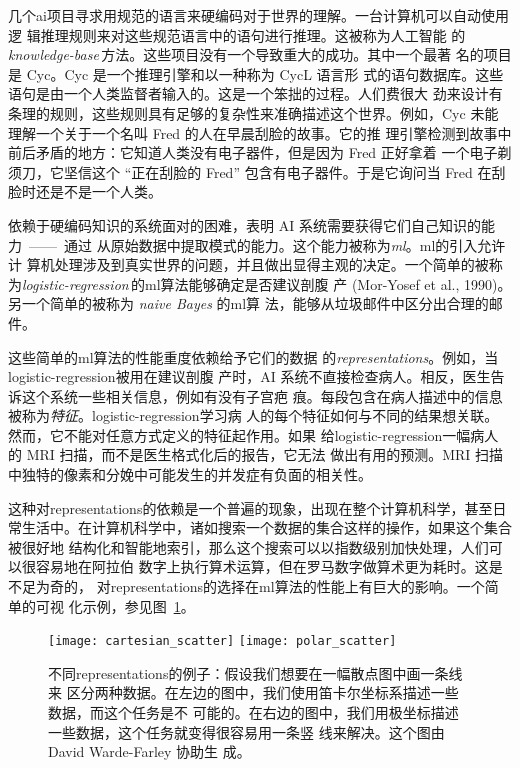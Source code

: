 几个\gls*{ai}项目寻求用规范的语言来硬编码对于世界的理解。一台计算机可以自动使用逻
辑推理规则来对这些规范语言中的语句进行推理。这被称为人工智能
的\emph{\gls{knowledge-base}}\,方法。这些项目没有一个导致重大的成功。其中一个最著
名的项目是 Cyc\citep{Lenat-1989-book}。Cyc 是一个推理引擎和以一种称为 CycL 语言形
式的语句数据库。这些语句是由一个人类监督者输入的。这是一个笨拙的过程。人们费很大
劲来设计有条理的规则，这些规则具有足够的复杂性来准确描述这个世界。例如，Cyc 未能
理解一个关于一个名叫 Fred 的人在早晨刮脸的故事\citep{MachineChangedWorld}。它的推
理引擎检测到故事中前后矛盾的地方：它知道人类没有电子器件，但是因为 Fred 正好拿着
一个电子剃须刀，它坚信这个 ``正在刮脸的 Fred'' 包含有电子器件。于是它询问当 Fred
在刮脸时还是不是一个人类。

依赖于硬编码知识的系统面对的困难，表明 AI 系统需要获得它们自己知识的能力~——~通过
从原始数据中提取模式的能力。这个能力被称为\emph{\gls{ml}}。\gls*{ml}的引入允许计
算机处理涉及到真实世界的问题，并且做出显得主观的决定。一个简单的被称
为\emph{\gls{logistic-regression}}\,的\gls*{ml}算法能够确定是否建议剖腹
产 (Mor-Yosef et al., 1990)。另一个简单的被称为 \emph{naive Bayes} 的\gls*{ml}算
法，能够从垃圾邮件中区分出合理的邮件。

这些简单的\gls*{ml}算法的性能重度依赖给予它们的数据
的\emph{\gls{representations}}。例如，当\gls*{logistic-regression}被用在建议剖腹
产时，AI 系统不直接检查病人。相反，医生告诉这个系统一些相关信息，例如有没有子宫疤
痕。每段包含在病人描述中的信息被称为\emph{特征}。\gls*{logistic-regression}学习病
人的每个特征如何与不同的结果想关联。然而，它不能对任意方式定义的特征起作用。如果
给\gls*{logistic-regression}一幅病人的 MRI 扫描，而不是医生格式化后的报告，它无法
做出有用的预测。MRI 扫描中独特的像素和分娩中可能发生的并发症有负面的相关性。

这种对\gls*{representations}的依赖是一个普遍的现象，出现在整个计算机科学，甚至日
常生活中。在计算机科学中，诸如搜索一个数据的集合这样的操作，如果这个集合被很好地
结构化和智能地索引，那么这个搜索可以以指数级别加快处理，人们可以很容易地在阿拉伯
数字上执行算术运算，但在罗马数字做算术更为耗时。这是不足为奇的，
对\gls*{representations}的选择在\gls*{ml}算法的性能上有巨大的影响。一个简单的可视
化示例，参见图~\ref{fig:different_representations}。

\begin{figure}[h]
  \centering
  \texttt{[image: cartesian\_scatter]}
  \texttt{[image: polar\_scatter]}
  \caption{不同\gls*{representations}的例子：假设我们想要在一幅散点图中画一条线来
    区分两种数据。在左边的图中，我们使用笛卡尔坐标系描述一些数据，而这个任务是不
    可能的。在右边的图中，我们用极坐标描述一些数据，这个任务就变得很容易用一条竖
    线来解决。这个图由 David Warde-Farley 协助生
    成。\label{fig:different_representations}}
\end{figure}

